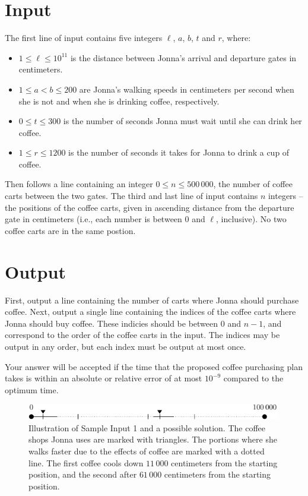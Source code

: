 \section*{Input}
The first line of input contains five integers $\ell$, $a$, $b$, $t$ and $r$, where:
\begin{itemize}
\setlength{\itemsep}{0pt}
\item $1 \le \ell \le 10^{11}$ is the distance between Jonna's arrival and departure gates in centimeters.
\item $1 \le a < b \le 200$ are Jonna's walking speeds in centimeters per second when she is not and when she is drinking coffee, respectively.
\item $0 \le t \le 300$ is the number of seconds Jonna must wait until she can drink her coffee.
\item $1 \le r \le 1200$ is the number of seconds it takes for Jonna to drink a cup of coffee.
\end{itemize}
Then follows a line containing an integer $0 \le n \le 500\,000$, the number of coffee carts between the two gates.  The third and last line of input contains $n$ integers -- the positions of the coffee carts, given in ascending distance from the departure gate in centimeters (i.e., each number is between $0$ and $\ell$, inclusive).  No two coffee carts are in the same postion.

\section*{Output}

First, output a line containing the number of carts where Jonna should
purchase coffee.  Next, output a single line containing the indices of
the coffee carts where Jonna should buy coffee.  These indicies should
be between $0$ and $n - 1$, and correspond to the order of the coffee
carts in the input.  The indices may be output in any order, but each
index must be output at most once.

Your answer will be accepted if the time that the proposed coffee
purchasing plan takes is within an absolute or relative error of at most
$10^{-9}$ compared to the optimum time.

\bigskip

\begin{figure}[h]
    \centering
    \includegraphics[width=0.99\textwidth]{fig.pdf}
    \caption{Illustration of Sample Input 1 and a possible solution.  The coffee shops Jonna uses are marked with triangles.  The portions where she walks faster due to the effects of coffee are marked with a dotted line.  The first coffee cools down $11\,000$ centimeters from the starting position, and the second after $61\,000$ centimeters from the starting position.
    }
\end{figure}


